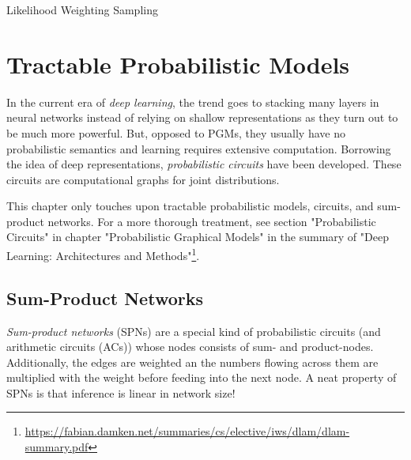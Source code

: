 			\begin{algorithm}  \DontPrintSemicolon
				\caption{Likelihood Weighting Sampling}
				\label{alg:likelihoodWeighting}
			\end{algorithm}

\chapter{Tractable Probabilistic Models}
	In the current era of \emph{deep learning}, the trend goes to stacking many layers in neural networks instead of relying on shallow representations as they turn out to be much more powerful. But, opposed to PGMs, they usually have no probabilistic semantics and learning requires extensive computation. Borrowing the idea of deep representations, \emph{probabilistic circuits} have been developed. These circuits are computational graphs for joint distributions.

	This chapter only touches upon tractable probabilistic models, circuits, and sum-product networks. For a more thorough treatment, see section "Probabilistic Circuits" in chapter "Probabilistic Graphical Models" in the summary of "Deep Learning: Architectures and Methods"\footnote{\url{https://fabian.damken.net/summaries/cs/elective/iws/dlam/dlam-summary.pdf}}.

	\section{Sum-Product Networks}
		\emph{Sum-product networks} (SPNs) are a special kind of probabilistic circuits (and arithmetic circuits (ACs)) whose nodes consists of sum- and product-nodes. Additionally, the edges are weighted an the numbers flowing across them are multiplied with the weight before feeding into the next node. A neat property of SPNs is that inference is linear in network size!

